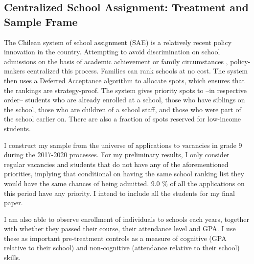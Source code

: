\documentclass[12pt]{article}
\begin{document}
\subsection{Centralized School Assignment: Treatment and Sample Frame}

The Chilean system of school assignment (SAE) is a relatively recent policy innovation in the country. Attempting to avoid discrimination on school admissions on the basis of academic achievement or family circumstances , policy-makers centralized this process. Families can rank schools at no cost. The system then uses a Deferred Acceptance algorithm to allocate spots, which ensures that the rankings are strategy-proof.  The system gives priority spots to --in respective order-- students who are already enrolled at a school, those who have siblings on the school, those who are children of a school staff, and those who were part of the school earlier on. There are also a fraction of spots reserved for low-income students. 


I construct my sample from the universe of applications to vacancies in grade 9 during the 2017-2020 processes. For my preliminary results, I only consider regular vacancies and students that do not have any of the aforementioned priorities, implying that conditional on  having the same school ranking list they would have the same chances of being admitted. 9.0 \% of all the applications on this period have any  priority.  I intend to include all the students for my final paper. 





I am also able to observe enrollment of individuals to schools each years, together with whether they passed their course, their attendance level and GPA. I use these as important pre-treatment controls as a measure of cognitive (GPA relative to their school) and non-cognitive (attendance relative to their school) skills.
\end{document}
